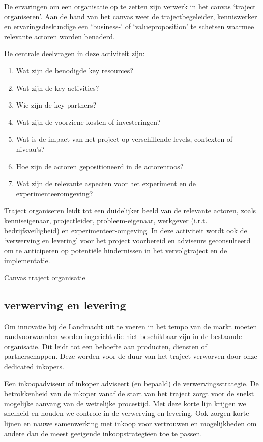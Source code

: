 \documentclass[
]{book}
\providecommand{\tightlist}{%
  \setlength{\itemsep}{0pt}\setlength{\parskip}{0pt}}
\begin{document}
De ervaringen om een organisatie op te zetten zijn verwerk in het canvas `traject organiseren'. Aan de hand van het canvas weet de trajectbegeleider, kenniswerker en ervaringsdeskundige een `business-' of `valueproposition' te schetsen waarmee relevante actoren worden benaderd.

De centrale deelvragen in deze activiteit zijn:

\begin{enumerate}
\def\labelenumi{\arabic{enumi}.}
\tightlist
\item
  Wat zijn de benodigde key resources?
\item
  Wat zijn de key activities?
\item
  Wie zijn de key partners?
\item
  Wat zijn de voorziene kosten of investeringen?
\item
  Wat is de impact van het project op verschillende levels, contexten of niveau's?
\item
  Hoe zijn de actoren gepositioneerd in de actorenroos?
\item
  Wat zijn de relevante aspecten voor het experiment en de experimenteeromgeving?
\end{enumerate}

Traject organiseren leidt tot een duidelijker beeld van de relevante actoren, zoals kenniseigenaar, projectleider, probleem-eigenaar, werkgever (i.r.t. bedrijfsveiligheid) en experimenteer-omgeving. In deze activiteit wordt ook de `verwerving en levering' voor het project voorbereid en adviseurs geconsulteerd om te anticiperen op potentiële hindernissen in het vervolgtraject en de implementatie.

\href{data/images/20200116-CDE-canvassen-trajectorganisatie.png}{Canvas traject organisatie}

\hypertarget{verwerving-en-levering}{%
\subsection{verwerving en levering}\label{verwerving-en-levering}}

Om innovatie bij de Landmacht uit te voeren in het tempo van de markt moeten randvoorwaarden worden ingericht die niet beschikbaar zijn in de bestaande organisatie. Dit leidt tot een behoefte aan producten, diensten of partnerschappen. Deze worden voor de duur van het traject verworven door onze dedicated inkopers.

Een inkoopadviseur of inkoper adviseert (en bepaald) de verwervingsstrategie. De betrokkenheid van de inkoper vanaf de start van het traject zorgt voor de snelst mogelijke aanvang van de wettelijke procestijd. Met deze korte lijn krijgen we snelheid en houden we controle in de verwerving en levering. Ook zorgen korte lijnen en nauwe samenwerking met inkoop voor vertrouwen en mogelijkheden om andere dan de meest geeigende inkoopstrategiëen toe te passen.
\end{document}

